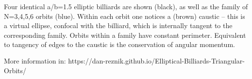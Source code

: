Four identical a/b=1.5 elliptic billiards are shown (black), as well as the family of N=3,4,5,6 orbits (blue). Within each orbit one notices a (brown) caustic -- this is a virtual ellipse, confocal with the billiard, which is internally tangent to the corresponding family.  Orbits within a family have constant perimeter. Equivalent to tangency of edges to the caustic is the conservation of angular momentum.

More information in: https://dan-reznik.github.io/Elliptical-Billiards-Triangular-Orbits/